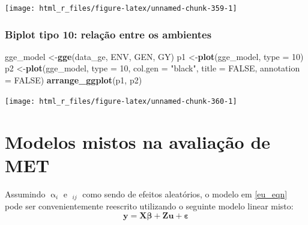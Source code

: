 \documentclass[
]{book}
\newenvironment{Shaded}{\begin{snugshade}}{\end{snugshade}}
\newcommand{\DataTypeTok}[1]{\textcolor[rgb]{0.13,0.29,0.53}{#1}}
\newcommand{\DecValTok}[1]{\textcolor[rgb]{0.00,0.00,0.81}{#1}}
\newcommand{\KeywordTok}[1]{\textcolor[rgb]{0.13,0.29,0.53}{\textbf{#1}}}
\newcommand{\NormalTok}[1]{#1}
\newcommand{\OtherTok}[1]{\textcolor[rgb]{0.56,0.35,0.01}{#1}}
\newcommand{\StringTok}[1]{\textcolor[rgb]{0.31,0.60,0.02}{#1}}
\begin{document}
\begin{center}\texttt{[image: html\_r\_files/figure-latex/unnamed-chunk-359-1]} \end{center}

\hypertarget{biplot-tipo-10-relauxe7uxe3o-entre-os-ambientes}{%
\subsubsection{Biplot tipo 10: relação entre os ambientes}\label{biplot-tipo-10-relauxe7uxe3o-entre-os-ambientes}}


\begin{Shaded}
\begin{Highlighting}[]
\NormalTok{gge_model <-}\KeywordTok{gge}\NormalTok{(data_ge, ENV, GEN, GY)}
\NormalTok{p1 <-}\KeywordTok{plot}\NormalTok{(gge_model, }\DataTypeTok{type =} \DecValTok{10}\NormalTok{)}
\NormalTok{p2 <-}\KeywordTok{plot}\NormalTok{(gge_model,}
          \DataTypeTok{type =} \DecValTok{10}\NormalTok{,}
          \DataTypeTok{col.gen =} \StringTok{"black"}\NormalTok{,}
          \DataTypeTok{title =} \OtherTok{FALSE}\NormalTok{,}
          \DataTypeTok{annotation =} \OtherTok{FALSE}\NormalTok{)}
\KeywordTok{arrange_ggplot}\NormalTok{(p1, p2)}
\end{Highlighting}
\end{Shaded}

\begin{center}\texttt{[image: html\_r\_files/figure-latex/unnamed-chunk-360-1]} \end{center}

\hypertarget{modelos-mistos-na-avaliauxe7uxe3o-de-met}{%
\section{Modelos mistos na avaliação de MET}\label{modelos-mistos-na-avaliauxe7uxe3o-de-met}}

Assumindo \(\mathop\alpha\nolimits_i\) e \(\mathop {(\alpha \tau )}\nolimits_{ij}\) como sendo de efeitos aleatórios, o modelo em \ref{eu_eqn} pode ser convenientemente reescrito utilizando o seguinte modelo linear misto:
\[ \label{meq}
{\boldsymbol{y  = X\beta  + Zu + \varepsilon }}
\]
\end{document}
